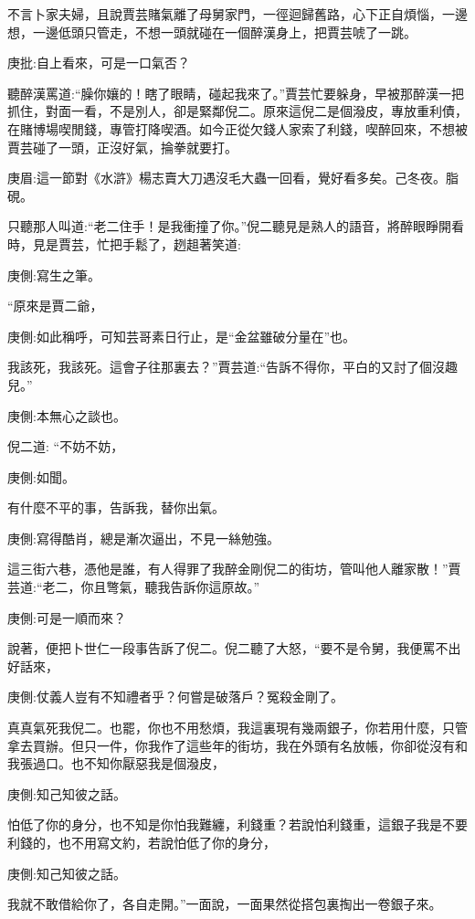 \begin{parag}
    不言卜家夫婦，且說賈芸賭氣離了母舅家門，一徑迴歸舊路，心下正自煩惱，一邊想，一邊低頭只管走，不想一頭就碰在一個醉漢身上，把賈芸唬了一跳。\begin{note}庚批:自上看來，可是一口氣否？\end{note}聽醉漢罵道:“臊你孃的！瞎了眼睛，碰起我來了。”賈芸忙要躲身，早被那醉漢一把抓住，對面一看，不是別人，卻是緊鄰倪二。原來這倪二是個潑皮，專放重利債，在賭博場喫閒錢，專管打降喫酒。如今正從欠錢人家索了利錢，喫醉回來，不想被賈芸碰了一頭，正沒好氣，掄拳就要打。\begin{note}庚眉:這一節對《水滸》楊志賣大刀遇沒毛大蟲一回看，覺好看多矣。己冬夜。脂硯。\end{note}只聽那人叫道:“老二住手！是我衝撞了你。”倪二聽見是熟人的語音，將醉眼睜開看時，見是賈芸，忙把手鬆了，趔趄著笑道:\begin{note}庚側:寫生之筆。\end{note}“原來是賈二爺，\begin{note}庚側:如此稱呼，可知芸哥素日行止，是“金盆雖破分量在”也。\end{note}我該死，我該死。這會子往那裏去？”賈芸道:“告訴不得你，平白的又討了個沒趣兒。”\begin{note}庚側:本無心之談也。\end{note}倪二道: “不妨不妨，\begin{note}庚側:如聞。\end{note}有什麼不平的事，告訴我，替你出氣。\begin{note}庚側:寫得酷肖，總是漸次逼出，不見一絲勉強。\end{note}這三街六巷，憑他是誰，有人得罪了我醉金剛倪二的街坊，管叫他人離家散！”賈芸道:“老二，你且彆氣，聽我告訴你這原故。”\begin{note}庚側:可是一順而來？\end{note}說著，便把卜世仁一段事告訴了倪二。倪二聽了大怒，“要不是令舅，我便罵不出好話來，\begin{note}庚側:仗義人豈有不知禮者乎？何嘗是破落戶？冤殺金剛了。\end{note}真真氣死我倪二。也罷，你也不用愁煩，我這裏現有幾兩銀子，你若用什麼，只管拿去買辦。但只一件，你我作了這些年的街坊，我在外頭有名放帳，你卻從沒有和我張過口。也不知你厭惡我是個潑皮，\begin{note}庚側:知己知彼之話。\end{note}怕低了你的身分，也不知是你怕我難纏，利錢重？若說怕利錢重，這銀子我是不要利錢的，也不用寫文約，若說怕低了你的身分，\begin{note}庚側:知己知彼之話。\end{note}我就不敢借給你了，各自走開。”一面說，一面果然從搭包裏掏出一卷銀子來。
\end{parag}


